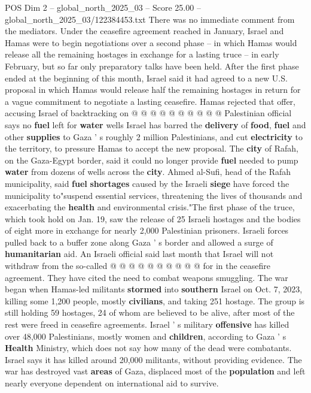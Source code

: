 \begin{textsample}{POS Dim 2 – global\_north\_2025\_03 – Score 25.00 – global\_north\_2025\_03/122384453.txt}
There was no immediate comment from the mediators.
Under the ceasefire agreement reached in January, Israel and Hamas were to begin negotiations over a second phase -- in which Hamas would release all the remaining hostages in exchange for a lasting truce -- in early February, but so far only preparatory talks have been held.
After the first phase ended at the beginning of this month, Israel said it had agreed to a new U.S. proposal in which Hamas would release half the remaining hostages in return for a vague commitment to negotiate a lasting ceasefire.
Hamas rejected that offer, accusing Israel of backtracking on @ @ @ @ @ @ @ @ @ @ Palestinian official says no \textbf{fuel} left for \textbf{water} wells Israel has barred the \textbf{delivery} of \textbf{food}, \textbf{fuel} and other \textbf{supplies} to Gaza ' s roughly 2 million Palestinians, and cut \textbf{electricity} to the territory, to pressure Hamas to accept the new proposal.
The \textbf{city} of Rafah, on the Gaza-Egypt border, said it could no longer provide \textbf{fuel} needed to pump \textbf{water} from dozens of wells across the \textbf{city}.
Ahmed al-Sufi, head of the Rafah municipality, said \textbf{fuel} \textbf{shortages} caused by the Israeli \textbf{siege} have forced the municipality to"suspend essential services, threatening the lives of thousands and exacerbating the \textbf{health} and environmental crisis."The first phase of the truce, which took hold on Jan. 19, saw the release of 25 Israeli hostages and the bodies of eight more in exchange for nearly 2,000 Palestinian prisoners.
Israeli forces pulled back to a buffer zone along Gaza ' s border and allowed a surge of \textbf{humanitarian} aid.
An Israeli official said last month that Israel will not withdraw from the so-called @ @ @ @ @ @ @ @ @ @ for in the ceasefire agreement.
They have cited the need to combat weapons smuggling.
The war began when Hamas-led militants \textbf{stormed} into \textbf{southern} Israel on Oct. 7, 2023, killing some 1,200 people, mostly \textbf{civilians}, and taking 251 hostage.
The group is still holding 59 hostages, 24 of whom are believed to be alive, after most of the rest were freed in ceasefire agreements.
Israel ' s military \textbf{offensive} has killed over 48,000 Palestinians, mostly women and \textbf{children}, according to Gaza ' s \textbf{Health} Ministry, which does not say how many of the dead were combatants.
Israel says it has killed around 20,000 militants, without providing evidence.
The war has destroyed vast \textbf{areas} of Gaza, displaced most of the \textbf{population} and left nearly everyone dependent on international aid to survive.

\end{textsample}
